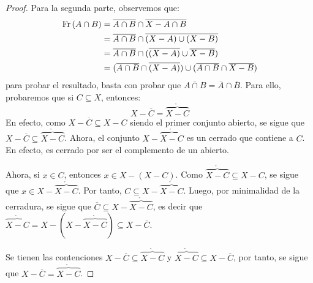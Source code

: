 \documentclass[12pt]{report}
\theoremstyle{largebreak}
\newcommand{\Int}[1]{\ensuremath{\mathring{#1}}}
\newcommand{\Cls}[1]{\ensuremath{\overline{#1}}}
\newcommand{\Fr}[1]{\ensuremath{\textup{Fr}\left(#1\right)}}
\begin{document}
\begin{proof}
        Para la segunda parte, observemos que:
        \begin{equation*}
            \begin{split}
                \Fr{A\cap B}&=\Cls{A\cap B}\cap\Cls{X-A\cap B}\\
                &=\Cls{A\cap B}\cap\Cls{(X-A)\cup(X-B)}\\
                &=\Cls{A\cap B}\cap(\Cls{(X-A)}\cup\Cls{X-B})\\
                &=(\Cls{A\cap B}\cap\Cls{(X-A)})\cup(\Cls{A\cap B}\cap\Cls{X-B})\\
            \end{split}
        \end{equation*}
        para probar el resultado, basta con probar que $\Cls{A\cap B}=\Cls{A}\cap\Cls{B}$. Para ello, probaremos que si $C\subseteq X$, entonces:
        \begin{equation*}
            X-\Cls{C}=\Int{\overbrace{X-C}}
        \end{equation*}
        En efecto, como $X-\Cls{C}\subseteq X-C$ siendo el primer conjunto abierto, se sigue que $X-\Cls{C}\subseteq\Int{\overbrace{X-C}}$. Ahora, el conjunto $X-\Int{\overbrace{X-C}}$ es un cerrado que contiene a $C$. En efecto, es cerrado por ser el complemento de un abierto.

        Ahora, si $x\in C$, entonces $x\in X-(X-C)$. Como $\Int{\overbrace{X-C}}\subseteq X-C$, se sigue que $x\in X-\Int{\overbrace{X-C}}$. Por tanto, $C\subseteq X-\Int{\overbrace{X-C}}$. Luego, por minimalidad de la cerradura, se sigue que $\Cls{C}\subseteq X-\Int{\overbrace{X-C}}$, es decir que $\Int{\overbrace{X-C}}=X-(X-\Int{\overbrace{X-C}})\subseteq X-\Cls{C}$.

        Se tienen las contenciones $X-\Cls{C}\subseteq\Int{\overbrace{X-C}}$ y $\Int{\overbrace{X-C}}\subseteq X-\Cls{C}$, por tanto, se sigue que $X-\Cls{C}=\Int{\overbrace{X-C}}$.


\end{proof}
\end{document}
